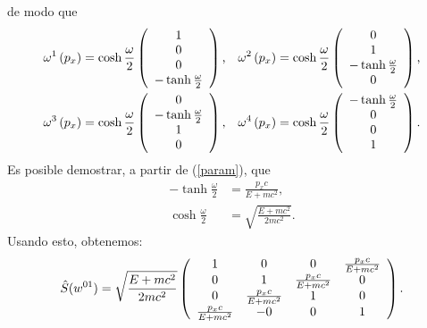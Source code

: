 de modo que
\begin{align}
\omega^1\left( p_{x}\right)  & =\cosh\frac{\omega}{2}\left(
\begin{array}
[c]{c}%
1\\
0\\
0\\
-\tanh\frac{\omega}{2}%
\end{array}
\right) \text{, \ \ }\omega^2\left( p_{x}\right) =\cosh\frac{\omega}%
{2}\left(
\begin{array}
[c]{c}%
0\\
1\\
-\tanh\frac{\omega}{2}\\
0
\end{array}
\right) \text{,}\\
\omega^{3}\left( p_{x}\right)  & =\cosh\frac{\omega}{2}\left(
\begin{array}
[c]{c}%
0\\
-\tanh\frac{\omega}{2}\\
1\\
0
\end{array}
\right) \text{, \ \ }\omega^{4}\left( p_{x}\right) =\cosh\frac{\omega}%
{2}\left(
\begin{array}
[c]{c}%
-\tanh\frac{\omega}{2}\\
0\\
0\\
1
\end{array}
\right) \text{.}%
\end{align}
Es posible demostrar, a partir de (\ref{param}), que
\begin{align}
-\tanh\frac{\omega}{2} & =\frac{p_{x}c}{E+mc^2},\\
\cosh\frac{\omega}{2} & =\sqrt{\frac{E+mc^2}{2mc^2}}.
\end{align}
Usando esto, obtenemos:
\begin{equation}
\hat{S}(w^{01}) 
 =\sqrt{\frac{E+mc^2}{2mc^2}}\left(
\begin{array}
[c]{cccc}%
1 & 0 & 0 & \frac{p_xc}{E+mc^2}\\
0 & 1 & \frac{p_xc}{E+mc^2} & 0\\
0 & \frac{p_xc}{E+mc^2} & 1 & 0\\
\frac{p_xc}{E+mc^2} & -0 & 0 & 1
\end{array}
\right) .
\end{equation} 


